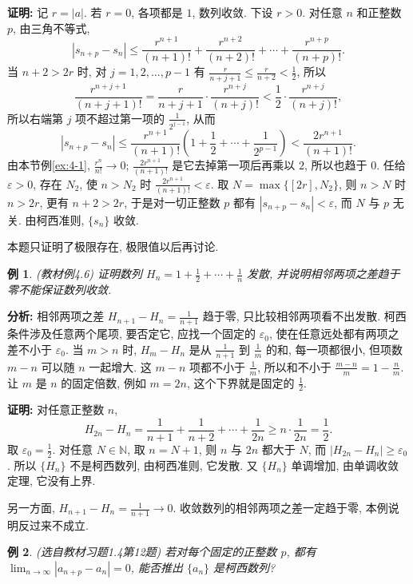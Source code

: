 \documentclass[UTF8,openany]{ctexbook}
\theoremstyle{chinesetextbook}
\newtheorem{example}{例}[section]
\newenvironment{cnproof}{\par\indent\textbf{证明:} \ignorespaces}{\par}
\begin{document}
\begin{cnproof}
记 $r=|a|$. 若 $r=0$, 各项都是 $1$, 数列收敛. 下设 $r>0$. 对任意 $n$ 和正整数 $p$, 由三角不等式,
\[
|s_{n+p}-s_n|\le\frac{r^{n+1}}{(n+1)!}+\frac{r^{n+2}}{(n+2)!}+\cdots+\frac{r^{n+p}}{(n+p)!}.
\]
当 $n+2>2r$ 时, 对 $j=1,2,\ldots,p-1$ 有 $\displaystyle\frac r{n+j+1}\le\frac r{n+2}<\frac12$, 所以
\[
\frac{r^{n+j+1}}{(n+j+1)!}=\frac r{n+j+1}\cdot\frac{r^{n+j}}{(n+j)!}<\frac12\cdot\frac{r^{n+j}}{(n+j)!},
\]
所以右端第 $j$ 项不超过第一项的 $\displaystyle\frac1{2^{j-1}}$, 从而
\[
|s_{n+p}-s_n|\le\frac{r^{n+1}}{(n+1)!}\left(1+\frac12+\cdots+\frac1{2^{p-1}}\right)<\frac{2r^{n+1}}{(n+1)!}.
\]
由本节例\ref{ex:4-1}, $\displaystyle\frac{r^n}{n!}\to0$; $\displaystyle\frac{2r^{n+1}}{(n+1)!}$ 是它去掉第一项后再乘以 $2$, 所以也趋于 $0$. 任给 $\varepsilon>0$, 存在 $N_2$, 使 $n>N_2$ 时 $\displaystyle\frac{2r^{n+1}}{(n+1)!}<\varepsilon$. 取 $N=\max\{[2r],N_2\}$, 则 $n>N$ 时 $n>2r$, 更有 $n+2>2r$, 于是对一切正整数 $p$ 都有 $|s_{n+p}-s_n|<\varepsilon$, 而 $N$ 与 $p$ 无关. 由柯西准则, $\{s_n\}$ 收敛.
\end{cnproof}
本题只证明了极限存在, 极限值以后再讨论.
\begin{example}\label{ex:4-6}
\textnormal{(教材例4.6)} 证明数列 $\displaystyle H_n=1+\frac12+\cdots+\frac1n$ 发散, 并说明相邻两项之差趋于零不能保证数列收敛.
\end{example}
\par\indent\textbf{分析:} 相邻两项之差 $\displaystyle H_{n+1}-H_n=\frac1{n+1}$ 趋于零, 只比较相邻两项看不出发散. 柯西条件涉及任意两个尾项, 要否定它, 应找一个固定的 $\varepsilon_0$, 使在任意远处都有两项之差不小于 $\varepsilon_0$. 当 $m>n$ 时, $H_m-H_n$ 是从 $\displaystyle\frac1{n+1}$ 到 $\displaystyle\frac1m$ 的和, 每一项都很小, 但项数 $m-n$ 可以随 $n$ 一起增大. 这 $m-n$ 项都不小于 $\displaystyle\frac1m$, 所以和不小于 $\displaystyle\frac{m-n}m=1-\frac nm$. 让 $m$ 是 $n$ 的固定倍数, 例如 $m=2n$, 这个下界就是固定的 $\displaystyle\frac12$.
\begin{cnproof}
对任意正整数 $n$,
\[
H_{2n}-H_n=\frac1{n+1}+\frac1{n+2}+\cdots+\frac1{2n}\ge n\cdot\frac1{2n}=\frac12.
\]
取 $\displaystyle\varepsilon_0=\frac12$. 对任意 $N\in\mathbb N$, 取 $n=N+1$, 则 $n$ 与 $2n$ 都大于 $N$, 而 $|H_{2n}-H_n|\ge\varepsilon_0$. 所以 $\{H_n\}$ 不是柯西数列, 由柯西准则, 它发散. 又 $\{H_n\}$ 单调增加, 由单调收敛定理, 它没有上界.

另一方面, $\displaystyle H_{n+1}-H_n=\frac1{n+1}\to0$. 收敛数列的相邻两项之差一定趋于零, 本例说明反过来不成立.
\end{cnproof}
\begin{example}
\textnormal{(选自教材习题1.4第12题)} 若对每个固定的正整数 $p$, 都有 $\displaystyle\lim_{n\to\infty}|a_{n+p}-a_n|=0$, 能否推出 $\{a_n\}$ 是柯西数列?
\end{example}
\end{document}

